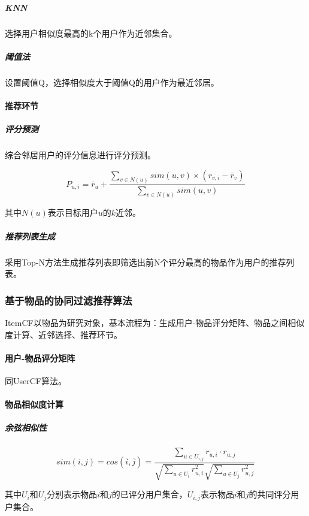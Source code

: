 \documentclass{upctrans}
\begin{document}
\subparagraph{KNN} 

选择用户相似度最高的k个用户作为近邻集合。

\subparagraph{阈值法}

设置阈值Q，选择相似度大于阈值Q的用户作为最近邻居。

\paragraph{推荐环节}
\subparagraph{评分预测}

综合邻居用户的评分信息进行评分预测。

\begin{equation*}
    P_{u,i}=\overline{r}_u+
    \frac{
        \sum\limits_{v\in{N(u)}}sim(u,v)\times (r_{v,i}-\overline{r}_v)
    }{
        \sum\limits_{v\in{N(u)}}sim(u,v)
    }
\end{equation*}

其中$N(u)$表示目标用户$u$的$k$近邻。

\subparagraph{推荐列表生成}

采用Top-N方法生成推荐列表即筛选出前N个评分最高的物品作为用户的推荐列表。

\subsubsection{基于物品的协同过滤推荐算法}

ItemCF以物品为研究对象，基本流程为：生成用户-物品评分矩阵、物品之间相似度计算、近邻选择、推荐环节。

\paragraph{用户-物品评分矩阵}

同UserCF算法。

\paragraph{物品相似度计算}
\subparagraph{余弦相似性}

\begin{equation*}
    sim(i,j)
    =cos(\overline{i},\overline{j})
    =\frac{\sum\limits_{u\in{U_{i,j}}}r_{u,i}\cdot r_{u,j}}{\sqrt{\sum\limits_{u\in{U_i}}r_{u,i}^2}\sqrt{\sum\limits_{u\in{U_j}}r_{u,j}^2}}
\end{equation*}

其中$U_i$和$U_j$分别表示物品$i$和$j$的已评分用户集合，$U_{i,j}$表示物品$i$和$j$的共同评分用户集合。
\end{document}
